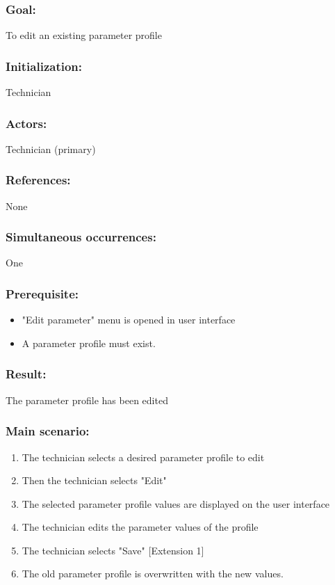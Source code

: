 \subsubsection*{Goal:}
To edit an existing parameter profile 

\subsubsection*{Initialization:}
Technician

\subsubsection*{Actors:}
Technician (primary)

\subsubsection*{References:}
None

\subsubsection*{Simultaneous occurrences:}
One

\subsubsection*{Prerequisite:}
\begin{itemize}
\item "Edit parameter" menu is opened in user interface
\item A parameter profile must exist.
\end{itemize}


\subsubsection*{Result:}
The parameter profile has been edited

\subsubsection*{Main scenario:}
\begin{enumerate}
\item The technician selects a desired parameter profile to edit
\item Then the technician selects "Edit"
\item The selected parameter profile values are displayed on the user interface
\item The technician edits the parameter values of the profile
\item The technician selects "Save" [Extension 1]
\item The old parameter profile is overwritten with the new values.
\end{enumerate}	

